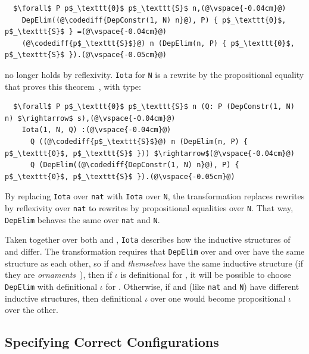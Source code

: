 \begin{lstlisting}
  $\forall$ P p$_\texttt{0}$ p$_\texttt{S}$ n,(@\vspace{-0.04cm}@)
    DepElim((@\codediff{DepConstr(1, N) n}@), P) { p$_\texttt{0}$, p$_\texttt{S}$ } =(@\vspace{-0.04cm}@)
    (@\codediff{p$_\texttt{S}$}@) n (DepElim(n, P) { p$_\texttt{0}$, p$_\texttt{S}$ }).(@\vspace{-0.05cm}@)
\end{lstlisting}
no longer holds by reflexivity.
\lstinline{Iota} for \lstinline{N} is a rewrite by the propositional equality that proves this theorem~\href{https://github.com/uwplse/pumpkin-pi/blob/v2.0.0/plugin/coq/nonorn.v}{},
with type:

\begin{lstlisting}
  $\forall$ P p$_\texttt{0}$ p$_\texttt{S}$ n (Q: P (DepConstr(1, N) n) $\rightarrow$ s),(@\vspace{-0.04cm}@)
    Iota(1, N, Q) :(@\vspace{-0.04cm}@)
      Q ((@\codediff{p$_\texttt{S}$}@) n (DepElim(n, P) { p$_\texttt{0}$, p$_\texttt{S}$ })) $\rightarrow$(@\vspace{-0.04cm}@)
      Q (DepElim((@\codediff{DepConstr(1, N) n}@), P) { p$_\texttt{0}$, p$_\texttt{S}$ }).(@\vspace{-0.05cm}@)
\end{lstlisting}
By replacing \lstinline{Iota} over \lstinline{nat} with \lstinline{Iota} over \lstinline{N},
the transformation replaces rewrites by reflexivity over \lstinline{nat} to rewrites by propositional equalities over \lstinline{N}.
That way, \lstinline{DepElim} behaves the same over \lstinline{nat} and \lstinline{N}.

Taken together over both \Aa and \B, \lstinline{Iota} describes how the inductive structures of \Aa and \B differ.
The transformation requires that \lstinline{DepElim} over \Aa and over \B have the same structure
as each other, so if \Aa and \B \textit{themselves} have the same 
inductive structure (if they are \textit{ornaments}~\cite{mcbride}),
then if $\iota$ is definitional for \Aa, it will be possible to choose
\lstinline{DepElim} with definitional $\iota$ for \B.
Otherwise, if \Aa and \B (like \lstinline{nat} and \lstinline{N}) have different inductive structures,
then definitional $\iota$ over one would become propositional $\iota$ over the other.

\subsection{Specifying Correct Configurations}
\label{sec:art}

